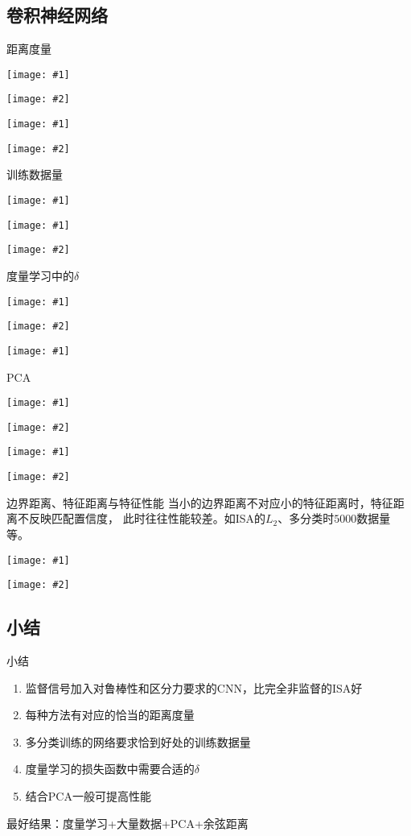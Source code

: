 \documentclass {beamer}
\newcommand{\addtwocolplot}[2]{\centering
    \begin{minipage}{0.49\textwidth}
        \centering
        \texttt{[image: \#1]}
    \end{minipage}
    \begin{minipage}{0.49\textwidth}
        \centering
        \texttt{[image: \#2]}
    \end{minipage}
}
\newcommand{\addplottcs}[1]{\begin{center}
    \texttt{[image: \#1]}
\end{center}}
\begin{document}
\subsection{卷积神经网络}
\begin{frame}{距离度量}
    \addtwocolplot{res/expr/clsfy/measure/0.pdf}{res/expr/clsfy/measure/1.pdf}
    \addtwocolplot{res/expr/mtrc/measure/0-0.pdf}{res/expr/mtrc/measure/1-0.pdf}
\end{frame}

\begin{frame}{训练数据量}
    \addplottcs{res/expr/clsfy/datasize.pdf}
    \addtwocolplot{res/expr/mtrc/datasize/0.pdf}{res/expr/mtrc/datasize/1.pdf}
\end{frame}

\begin{frame}{度量学习中的$\delta$}
    \addtwocolplot{res/expr/mtrc/delta/0.pdf}{res/expr/mtrc/delta/1.pdf}
    \addplottcs{res/expr/mtrc/delta/2.pdf}
\end{frame}

\begin{frame}{PCA}
    \addtwocolplot{res/expr/clsfy/pca/0.pdf}{res/expr/clsfy/pca/1.pdf}
    \addtwocolplot{res/expr/mtrc/pca/0.pdf}{res/expr/mtrc/pca/1.pdf}
\end{frame}

\begin{frame}{边界距离、特征距离与特征性能}
    当小的边界距离不对应小的特征距离时，特征距离不反映匹配置信度，
    此时往往性能较差。如ISA的$L_2$、多分类时$5000$数据量等。

    \vspace{1em}
    \addtwocolplot{res/expr/border-dist-stat/l2.pdf}
        {res/expr/border-dist-stat/cos.pdf}
\end{frame}

\subsection{小结}
\begin{frame}{小结}
    \begin{enumerate}
        \item 监督信号加入对鲁棒性和区分力要求的CNN，比完全非监督的ISA好
        \item 每种方法有对应的恰当的距离度量
        \item 多分类训练的网络要求恰到好处的训练数据量
        \item 度量学习的损失函数中需要合适的$\delta$
        \item 结合PCA一般可提高性能
    \end{enumerate}
    最好结果：度量学习+大量数据+PCA+余弦距离
\end{frame}
\end{document}
